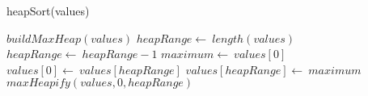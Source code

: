 \documentclass[a4paper,10pt]{article}
\begin{document}
\begin{algorithm}
\caption{heapSort(values)}
\begin{algorithmic}[5]

\STATE {}
\STATE {}
  \STATE \(buildMaxHeap(values)\)
  \STATE \(heapRange\gets\ length(values)\)
    \STATE \(heapRange\gets\ heapRange-1\)
    \STATE \(maximum\gets\ values[0]\)
    \STATE \(values[0]\gets\ values[heapRange]\)
    \STATE \(values[heapRange]\gets\ maximum\)
    \STATE \(maxHeapify(values,0,heapRange)\)
  \ENDFOR

\end{algorithmic}
\end{algorithm}


\STATE {}
\end{document}
